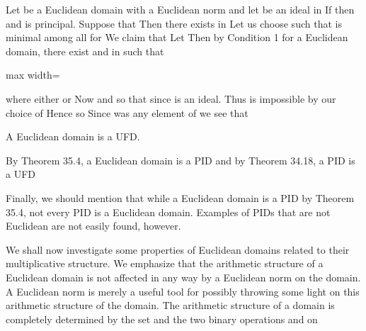 \documentclass[11pt,oneside]{article}
\begin{document}
\begin{BookBody}

 Let  be a Euclidean domain with a Euclidean norm \BookInline{\nu,\allowbreak } and let  be an ideal in  If  then  and  is principal. Suppose that  Then there exists  in  Let us choose  such that  is minimal among all  for  We claim that  Let  Then by Condition 1 for a Euclidean domain, there exist  and  in  such that

\begin{center}\begin{adjustbox}{max width=\linewidth}\end{adjustbox}\end{center}

\noindent where either  or  Now  and  so that  since  is an ideal. Thus  is impossible by our choice of  Hence  so  Since  was any element of  we see that \BookEnd{\blacklozenge}

 A Euclidean domain is a UFD.

 By Theorem 35.4, a Euclidean domain is a PID and by Theorem 34.18, a PID is a UFD\BookEnd{\blacklozenge}

Finally, we should mention that while a Euclidean domain is a PID by Theorem 35.4, not every PID is a Euclidean domain. Examples of PIDs that are not Euclidean are not easily found, however.


\noindent We shall now investigate some properties of Euclidean domains related to their multiplicative structure. We emphasize that the arithmetic structure of a Euclidean domain is not affected in any way by a Euclidean norm \BookInline{\nu } on the domain. A Euclidean norm is merely a useful tool for possibly throwing some light on this arithmetic structure of the domain. The arithmetic structure of a domain  is completely determined by the set  and the two binary operations \BookInline{+ } and \BookInline{\cdot } on 


\end{BookBody}
\end{document}
